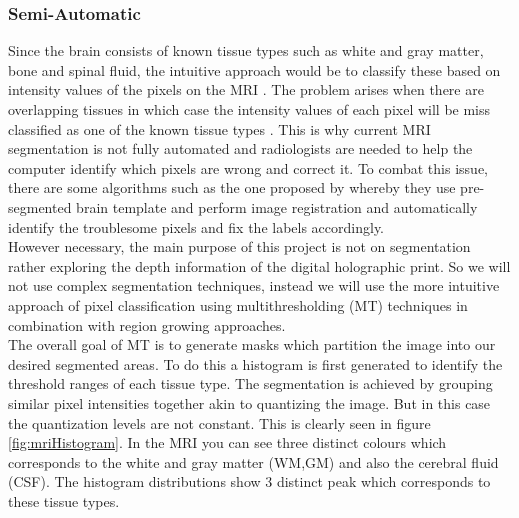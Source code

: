 \subsubsection{Semi-Automatic}

Since the brain consists of known tissue types such as white and gray matter, bone and spinal fluid, the intuitive approach would be to classify these based on intensity values of the pixels on the MRI \cite{atkins1998fully}.  The problem arises when there are overlapping tissues in which case the intensity values of each pixel will be miss classified as one of the known tissue types \cite{undeman2003fully}.  This is why current MRI segmentation is not fully automated and radiologists are needed to help the computer identify which pixels are wrong and correct it. To combat this issue, there are some algorithms such as the one proposed by \cite{lenroot2006brain} whereby they use pre-segmented brain template and perform image registration and automatically identify the troublesome pixels and fix the labels accordingly.\\  

However necessary, the main purpose of this project is not on segmentation rather exploring the depth information of the digital holographic print.  So we will not use complex segmentation techniques, instead we will use the more intuitive approach of pixel classification using multithresholding (MT) techniques \cite{sahoo1988survey} in combination with region growing approaches\cite{adams1994seeded}.\\

The overall goal of MT is to generate masks which partition the image into our desired segmented areas.  To do this a histogram is first generated to identify the threshold ranges of each tissue type.  The segmentation is achieved by grouping similar pixel intensities together akin to quantizing the image.  But in this case the quantization levels are not constant. This is clearly seen in figure \ref{fig:mriHistogram}.  In the MRI you can see three distinct colours which corresponds to the white and gray matter (WM,GM) and also the cerebral fluid (CSF).  The histogram distributions show 3 distinct peak which corresponds to these tissue types.


